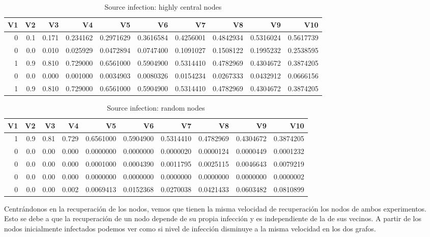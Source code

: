 \documentclass[
]{article}
\begin{document}
\begin{table}[!h]

\caption{\label{tab:unnamed-chunk-4}Source infection: highly central nodes}
\centering
\fontsize{7}{9}\selectfont
\begin{tabular}[t]{rrrrrrrrrr}
\toprule
V1 & V2 & V3 & V4 & V5 & V6 & V7 & V8 & V9 & V10\\
\midrule
0 & 0.1 & 0.171 & 0.234162 & 0.2971629 & 0.3616584 & 0.4256001 & 0.4842934 & 0.5316024 & 0.5617739\\
0 & 0.0 & 0.010 & 0.025929 & 0.0472894 & 0.0747400 & 0.1091027 & 0.1508122 & 0.1995232 & 0.2538595\\
1 & 0.9 & 0.810 & 0.729000 & 0.6561000 & 0.5904900 & 0.5314410 & 0.4782969 & 0.4304672 & 0.3874205\\
0 & 0.0 & 0.000 & 0.001000 & 0.0034903 & 0.0080326 & 0.0154234 & 0.0267333 & 0.0432912 & 0.0666156\\
1 & 0.9 & 0.810 & 0.729000 & 0.6561000 & 0.5904900 & 0.5314410 & 0.4782969 & 0.4304672 & 0.3874205\\
\bottomrule
\end{tabular}
\end{table}

\begin{table}[!h]

\caption{\label{tab:unnamed-chunk-4}Source infection: random nodes}
\centering
\fontsize{7}{9}\selectfont
\begin{tabular}[t]{rrrrrrrrrr}
\toprule
V1 & V2 & V3 & V4 & V5 & V6 & V7 & V8 & V9 & V10\\
\midrule
1 & 0.9 & 0.81 & 0.729 & 0.6561000 & 0.5904900 & 0.5314410 & 0.4782969 & 0.4304672 & 0.3874205\\
0 & 0.0 & 0.00 & 0.000 & 0.0000000 & 0.0000000 & 0.0000020 & 0.0000124 & 0.0000449 & 0.0001232\\
0 & 0.0 & 0.00 & 0.000 & 0.0001000 & 0.0004390 & 0.0011795 & 0.0025115 & 0.0046643 & 0.0079219\\
0 & 0.0 & 0.00 & 0.000 & 0.0000000 & 0.0000000 & 0.0000000 & 0.0000000 & 0.0000000 & 0.0000002\\
0 & 0.0 & 0.00 & 0.002 & 0.0069413 & 0.0152368 & 0.0270038 & 0.0421433 & 0.0603482 & 0.0810899\\
\bottomrule
\end{tabular}
\end{table}

Centrándonos en la recuperación de los nodos, vemos que tienen la misma
velocidad de recuperación los nodos de ambos experimentos. Esto se debe
a que la recuperación de un nodo depende de su propia infección y es
independiente de la de sus vecinos. A partir de los nodos inicialmente
infectados podemos ver como si nivel de infección disminuye a la misma
velocidad en los dos grafos.
\end{document}
